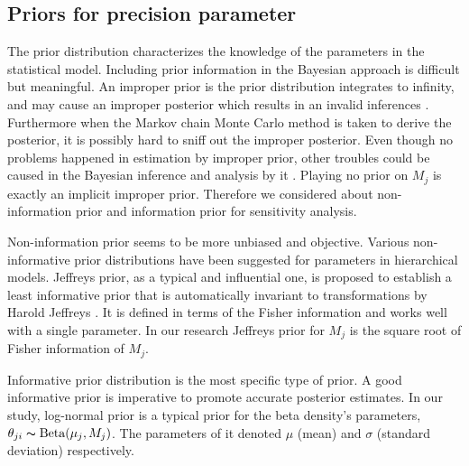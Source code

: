 \documentclass{bioinfo}
\begin{document}
\subsection{Priors for precision parameter}
The prior distribution characterizes the knowledge of the parameters in the statistical model. Including prior information in the Bayesian approach is difficult but meaningful.
An improper prior is the prior distribution integrates to infinity, and may cause an improper posterior which results in an invalid inferences \citep{lesaffre2012bayesian}.
Furthermore when the Markov chain Monte Carlo method is taken to derive the posterior, it is possibly hard to sniff out the improper posterior.
Even though no problems happened in estimation by improper prior, other troubles could be caused in the Bayesian inference and analysis by it \citep{stein1965approximation}.
Playing no prior on $ M_{j}$ is exactly an implicit improper prior. Therefore we considered about non-information prior and information prior for sensitivity analysis.

Non-information prior seems to be more unbiased and objective. 
Various non-informative prior distributions have been suggested for parameters in hierarchical models.
Jeffreys prior, as a typical and influential one, is proposed to establish a least informative prior that is automatically invariant to transformations by Harold Jeffreys \citep{jeffreys1946invariant}.
It is defined in terms of the Fisher information and works well with a single parameter. In our research Jeffreys prior for $M_j$ is the square root of Fisher information of $M_j$.

Informative prior distribution is the most specific type of prior. A good informative prior is imperative to promote accurate posterior estimates.
In our study, log-normal prior is a typical prior for the beta density's parameters, $\theta_{ji} \thicksim \text{Beta}(\mu_j, M_j)$.
The parameters of it denoted $\mu$ (mean) and $\sigma$ (standard deviation) respectively.

\end{document}
